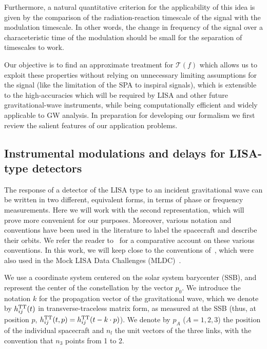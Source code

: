 \documentclass[aps,showpacs,twocolumn,
prd,superscriptaddress,nofootinbib]{revtex4-1}
\newcommand\calT{{\mathcal{T}}}
\newcommand{\hatk}{k}
\begin{document}
Furthermore, a natural quantitative criterion for the applicability of this idea is given by the comparison of the radiation-reaction timescale of the signal with the modulation timescale. In other words, the change in frequency of the signal over a characeteristic time of the modulation should be small for the separation of timescales to work.

Our objective is to find an approximate treatment for $\calT(f)$ which allows us to exploit these properties without relying on unnecessary limiting assumptions for the signal (like the limitation of the SPA to inspiral signals), which is extensible to the high-accuracies which will be required by LISA and other future gravitational-wave instruments, while being computationally efficient and widely applicable to GW analysis. In preparation for developing our formalism we first review the salient features of our application problems.

\subsection{Instrumental modulations and delays for LISA-type detectors}
\label{subsec:modulationLISA}

The response of a detector of the LISA type to an incident gravitational wave can be written in two different, equivalent forms, in terms of phase or frequency measurements. Here we will work with the second representation, which will prove more convenient for our purposes. Moreover, various notation and conventions have been used in the literature to label the spacecraft and describe their orbits. We refer the reader to~\cite{Vallisneri04} for a comparative account on these various conventions. In this work, we will keep close to the conventions of~\cite{Vallisneri04}, which were also used in the Mock LISA Data Challenges (MLDC)~\cite{MLDC4}.

We use a coordinate system centered on the solar system barycenter (SSB), and represent the center of the constellation by the vector $p_{0}$. We introduce the notation $\hatk$ for the propagation vector of the gravitational wave, which we denote by $h_{ij}^{\rm TT}(t)$ in transverse-traceless matrix form, as measured at the SSB (thus, at position $p$, $h_{ij}^{\rm TT}(t, p) = h_{ij}^{\rm TT}(t - \hatk \cdot p)$). We denote by $p_{A}$ ($A=1,2,3$) the position of the individual spacecraft and $n_{l}$ the unit vectors of the three links, with the convention that $n_{3}$ points from 1 to 2.
\end{document}
